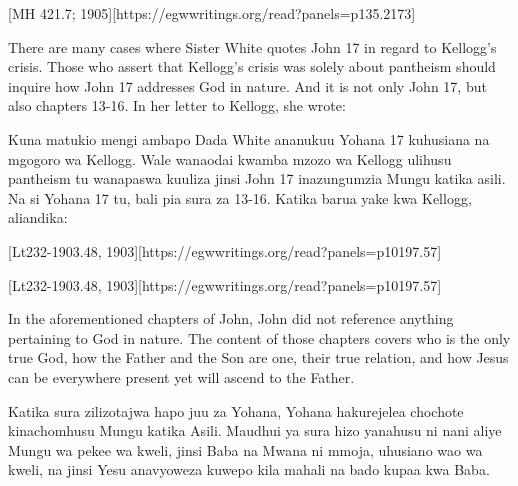 [MH 421.7; 1905][https://egwwritings.org/read?panels=p135.2173]


There are many cases where Sister White quotes John 17 in regard to Kellogg’s crisis. Those who assert that Kellogg’s crisis was solely about pantheism should inquire how John 17 addresses God in nature. And it is not only John 17, but also chapters 13-16. In her letter to Kellogg, she wrote:


Kuna matukio mengi ambapo Dada White ananukuu Yohana 17 kuhusiana na mgogoro wa Kellogg. Wale wanaodai kwamba mzozo wa Kellogg ulihusu pantheism tu wanapaswa kuuliza jinsi John 17 inazungumzia Mungu katika asili. Na si Yohana 17 tu, bali pia sura za 13-16. Katika barua yake kwa Kellogg, aliandika:


[Lt232-1903.48, 1903][https://egwwritings.org/read?panels=p10197.57]


[Lt232-1903.48, 1903][https://egwwritings.org/read?panels=p10197.57]


In the aforementioned chapters of John, John did not reference anything pertaining to God in nature. The content of those chapters covers who is the only true God, how the Father and the Son are one, their true relation, and how Jesus can be everywhere present yet will ascend to the Father.


Katika sura zilizotajwa hapo juu za Yohana, Yohana hakurejelea chochote kinachomhusu Mungu katika Asili. Maudhui ya sura hizo yanahusu ni nani aliye Mungu wa pekee wa kweli, jinsi Baba na Mwana ni mmoja, uhusiano wao wa kweli, na jinsi Yesu anavyoweza kuwepo kila mahali na bado kupaa kwa Baba.


